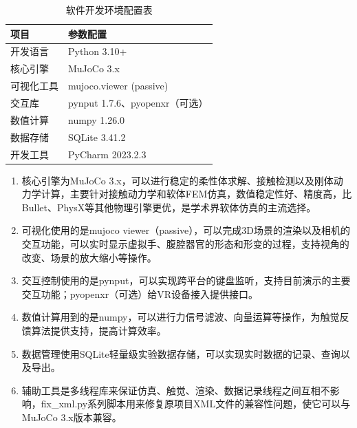 \begin{table}[H]
    \centering
    \caption{软件开发环境配置表}
    \label{tab:software_env}
    \begin{tabular}{|l|l|}
        \hline
        \textbf{项目} & \textbf{参数配置} \\
        \hline
        开发语言 & Python 3.10+ \\
        \hline
        核心引擎 & MuJoCo 3.x \\
        \hline
        可视化工具 & mujoco.viewer (passive) \\
        \hline
        交互库 & pynput 1.7.6、pyopenxr（可选） \\
        \hline
        数值计算 & numpy 1.26.0 \\
        \hline
        数据存储 & SQLite 3.41.2 \\
        \hline
        开发工具 & PyCharm 2023.2.3 \\
        \hline
    \end{tabular}
\end{table}

\begin{enumerate}
    \item 核心引擎为MuJoCo 3.x，可以进行稳定的柔性体求解、接触检测以及刚体动力学计算，主要针对接触动力学和软体FEM仿真，数值稳定性好、精度高，比Bullet、PhysX等其他物理引擎更优，是学术界软体仿真的主流选择。
    
    \item 可视化使用的是mujoco viewer（passive），可以完成3D场景的渲染以及相机的交互功能，可以实时显示虚拟手、腹腔器官的形态和形变的过程，支持视角的改变、场景的放大缩小等操作。
    
    \item 交互控制使用的是pynput，可以实现跨平台的键盘监听，支持目前演示的主要交互功能；pyopenxr（可选）给VR设备接入提供接口。
    
    \item 数值计算用到的是numpy，可以进行力信号滤波、向量运算等操作，为触觉反馈算法提供支持，提高计算效率。
    
    \item 数据管理使用SQLite轻量级实验数据存储，可以实现实时数据的记录、查询以及导出。
    
    \item 辅助工具是多线程库来保证仿真、触觉、渲染、数据记录线程之间互相不影响，fix\_xml.py系列脚本用来修复原项目XML文件的兼容性问题，使它可以与MuJoCo 3.x版本兼容。
\end{enumerate}

